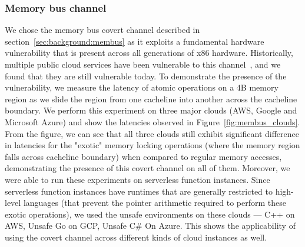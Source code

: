 
\subsubsection{Memory bus channel}
We chose the memory bus covert channel described in
section~\ref{sec:background:membus} as it exploits a fundamental hardware
vulnerability that is present across all generations of x86 hardware.
Historically, multiple public cloud services have been vulnerable to this
channel~\cite{varad191016,zhang2016}, and we found that they are still
vulnerable today. To demonstrate the presence of the vulnerability, we measure
the latency of atomic operations on a 4B memory region as we slide the region
from one cacheline into another across the cacheline boundary. We perform this
experiment on three major clouds (AWS, Google and Microsoft Azure) and show the
latencies observed in Figure~\ref{fig:membus_clouds}. From the figure, we can
see that all three clouds still exhibit significant difference in latencies for
the "exotic" memory locking operations (where the memory region falls across
cacheline boundary) when compared to regular memory accesses, demonstrating the
presence of this covert channel on all of them. Moreover, we were able to run
these experiments on serverless function instances. Since serverless function
instances have runtimes that are generally restricted to high-level languages
(that prevent the pointer arithmetic required to perform these exotic
operations), we used the unsafe environments on these clouds --- C++ on AWS,
Unsafe Go on GCP, Unsafe C\# On Azure. This shows the applicability of using the
covert channel across different kinds of cloud instances as well.


